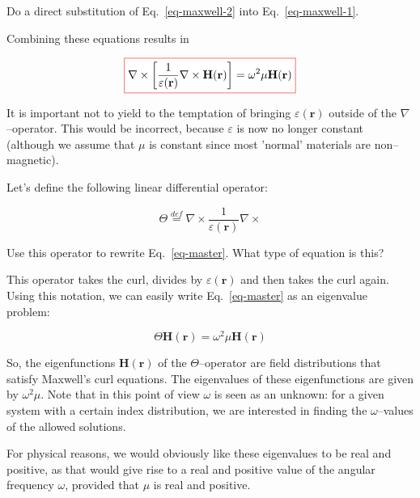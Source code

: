 \begin{cue}
Do a direct substitution of Eq.~\ref{eq-maxwell-2} into Eq.~\ref{eq-maxwell-1}.  
\end{cue}

Combining these equations results in

\begin{equation}
\fbox{$\displaystyle
\nabla \times \left[ \frac{1}{\varepsilon({\mathbf r})}\nabla \times {\mathbf H({\mathbf r})}  \right ] = \omega^2 \mu {\mathbf H({\mathbf r})} \label{eq-master}
$}
\end{equation} 

It is important not to yield to the temptation of bringing $\varepsilon({\mathbf r})$  outside of the $\nabla$--operator. This would be incorrect, because $\varepsilon$ is now no longer constant (although we assume that $\mu$ is constant since most 'normal' materials are non--magnetic).

Let's define the following linear differential operator:

\begin{equation}
\Theta \stackrel{def}{=} \nabla \times  \frac{1}{\varepsilon({\mathbf r})}\nabla \times
\end{equation} 

\begin{cue}
Use this operator to rewrite Eq.~\ref{eq-master}. What type of equation is this?   
\end{cue}

This operator takes the curl, divides by $\varepsilon({\mathbf r})$ and then takes the curl again. Using this notation, we can easily write Eq.~\ref{eq-master} as an eigenvalue problem:

\begin{equation}
\Theta {\mathbf H({\mathbf r})} = \omega^2 \mu {\mathbf H({\mathbf r})}
\end{equation} 

So, the eigenfunctions ${\mathbf H({\mathbf r})}$ of the $\Theta$--operator are field distributions that satisfy Maxwell's curl equations. The eigenvalues of these eigenfunctions are given by $\omega^2 \mu$. Note that in this point of view $\omega$ is seen as an unknown: for a given system with a certain index distribution, we are interested in finding the  $\omega$--values of the allowed solutions.

For physical reasons, we would obviously like these eigenvalues to be real and positive, as that would give rise to a real and positive value of the angular frequency $\omega$, provided that $\mu$ is real and positive.

